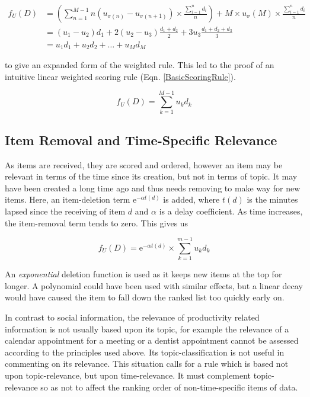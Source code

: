 \begin{align}\label{OurWeightedRuleDerivation}
f_U (D) &= \left(\sum_{n=1}^{M-1} n (u_{\sigma{(n)}} - u_{\sigma{(n+1)}})\times \frac{\sum_{i=1}^{n} d_i}{n}\right) + M \times u_\sigma{(M)} \times \frac{\sum_{i=1}^{n} d_i}{n} 
\\ &= (u_1-u_2)d_1 + 2(u_2-u_3)\frac{d_1+d_2}{2} + 3u_3\frac{d_1+d_2+d_3}{3}
\\ &= u_1d_1 + u_2d_2 + \dots + u_Md_M
\end{align}

to give an expanded form of the weighted rule. This led to the proof of an intuitive linear weighted scoring rule (Eqn. \ref{BasicScoringRule}).

\begin{equation}\label{BasicScoringRule}
f_U (D) = \sum_{k=1}^{M-1} u_kd_k
\end{equation}

\subsection{Item Removal and Time-Specific Relevance}

As items are received, they are scored and ordered, however an item may be relevant in terms of the time since its creation, but not in terms of topic. It may have been created a long time ago and thus needs removing to make way for new items. Here, an item-deletion term ${\mathrm{e}}^{-\alpha t(d)}$ is added, where $t(d)$ is the minutes lapsed since the receiving of item $d$ and $\alpha$ is a delay coefficient. As time increases, the item-removal term tends to zero. This gives us

\begin{equation}\label{BasicScoringRule2}
	f_U (D) = {\mathrm{e}}^{-\alpha t(d)} \times \sum_{k=1}^{m-1} u_kd_k
\end{equation}

An \emph{exponential} deletion function is used as it keeps new items at the top for longer. A polynomial could have been used with similar effects, but a linear decay would have caused the item to fall down the ranked list too quickly early on.

In contrast to social information, the relevance of productivity related information is not usually based upon its topic, for example the relevance of a calendar appointment for a meeting or a dentist appointment cannot be assessed according to the principles used above. Its topic-classification is not useful in commenting on its relevance. This situation calls for a rule which is based not upon topic-relevance, but upon time-relevance. It must complement topic-relevance so as not to affect the ranking order of non-time-specific items of data. 

